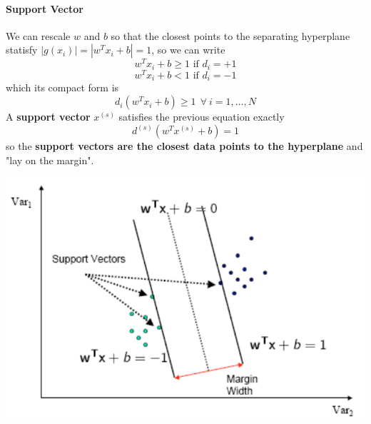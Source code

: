 \documentclass[10pt]{report}
\begin{document}
\paragraph{Support Vector} We can rescale $w$ and $b$ so that the closest points to the separating hyperplane statisfy $|g(x_i)| = |w^Tx_i + b| = 1$, so we can write $$w^Tx_i + b \geq 1\text{ if }d_i = +1$$ $$w^Tx_i + b < 1\text{ if }d_i = -1$$ which its compact form is $$d_i(w^Tx_i + b) \geq 1\:\:\forall\:i=1,\ldots,N$$
A \textbf{support vector} $x^{(s)}$ satisfies the previous equation exactly $$d^{(s)}(w^Tx^{(s)}+b) = 1$$ so the \textbf{support vectors are the closest data points to the hyperplane} and "lay on the margin".
\begin{center}
	\includegraphics[scale=0.5]{19.png}
\end{center}
\end{document}
